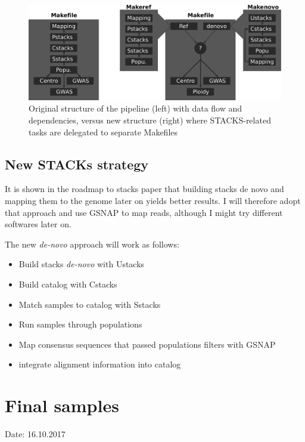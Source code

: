 \documentclass[10pt,a4paper]{report}
\begin{document}
\begin{figure}
\begin{center}
\includegraphics[width=\textwidth]{reorg/pipeline_reorg.pdf}
\caption{Original structure of the pipeline (left) with data flow and dependencies, versus new structure (right) where STACKS-related tasks are delegated to separate Makefiles}
\label{pipe_reorg}
\end{center}
\end{figure}

\section{New STACKs strategy}
It is shown in the roadmap to stacks paper that building stacks de novo and mapping them to the genome later on yields better results. I will therefore adopt that approach and use GSNAP to map reads, although I might try different softwares later on.

The new \textit{de-novo} approach will work as follows:

\begin{itemize}
\item Build stacks \textit{de-novo} with Ustacks
\item Build catalog with Cstacks
\item Match samples to catalog with Sstacks
\item Run samples through populations
\item Map consensus sequences that passed populations filters with GSNAP
\item integrate alignment information into catalog
\end{itemize}

\chapter{Final samples}
Date: 16.10.2017
\end{document}

